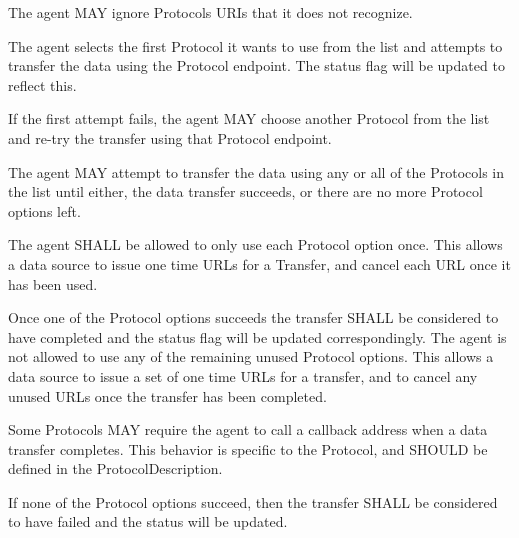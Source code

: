 \documentclass[11pt,a4paper]{ivoa}
\begin{document}
The agent MAY ignore Protocols URIs that it does not recognize.

The agent selects the first Protocol it wants to use from the list and attempts to transfer the data using the Protocol endpoint. The status flag will be updated to reflect this.

If the first attempt fails, the agent MAY choose another Protocol from the list and re-try the transfer using that Protocol endpoint.

The agent MAY attempt to transfer the data using any or all of the Protocols in the list until either, the data transfer succeeds, or there are no more Protocol options left.

The agent SHALL be allowed to only use each Protocol option once. This allows a data source to issue one time URLs for a Transfer, and cancel each URL once it has been used.

Once one of the Protocol options succeeds the transfer SHALL be considered to have completed and the status flag will be updated correspondingly. The agent is not allowed to use any of the remaining unused Protocol options. This allows a data source to issue a set of one time URLs for a transfer, and to cancel any unused URLs once the transfer has been completed.

Some Protocols MAY require the agent to call a callback address when a data transfer completes. This behavior is specific to the Protocol, and SHOULD be defined in the ProtocolDescription.

If none of the Protocol options succeed, then the transfer SHALL be considered to have failed and the status will be updated.
\end{document}
